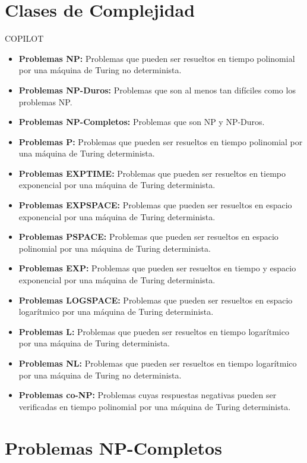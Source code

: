 \documentclass{templateNote}
\begin{document}
\section{Clases de Complejidad}
COPILOT
\begin{itemize}
    \item \textbf{Problemas NP:} Problemas que pueden ser resueltos en tiempo polinomial por una máquina de Turing no determinista.
    \item \textbf{Problemas NP-Duros:} Problemas que son al menos tan difíciles como los problemas NP.
    \item \textbf{Problemas NP-Completos:} Problemas que son NP y NP-Duros.
    \item \textbf{Problemas P:} Problemas que pueden ser resueltos en tiempo polinomial por una máquina de Turing determinista.
    \item \textbf{Problemas EXPTIME:} Problemas que pueden ser resueltos en tiempo exponencial por una máquina de Turing determinista.
    \item \textbf{Problemas EXPSPACE:} Problemas que pueden ser resueltos en espacio exponencial por una máquina de Turing determinista.
    \item \textbf{Problemas PSPACE:} Problemas que pueden ser resueltos en espacio polinomial por una máquina de Turing determinista.
    \item \textbf{Problemas EXP:} Problemas que pueden ser resueltos en tiempo y espacio exponencial por una máquina de Turing determinista.
    \item \textbf{Problemas LOGSPACE:} Problemas que pueden ser resueltos en espacio logarítmico por una máquina de Turing determinista.
    \item \textbf{Problemas L:} Problemas que pueden ser resueltos en tiempo logarítmico por una máquina de Turing determinista.
    \item \textbf{Problemas NL:} Problemas que pueden ser resueltos en tiempo logarítmico por una máquina de Turing no determinista.
    \item \textbf{Problemas co-NP:} Problemas cuyas respuestas negativas pueden ser verificadas en tiempo polinomial por una máquina de Turing determinista.
\end{itemize}

\section{Problemas NP-Completos}
\end{document}
